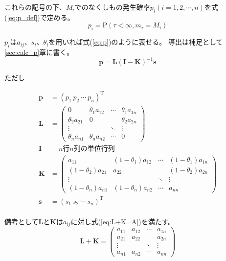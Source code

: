 \documentclass{jarticle}
\numberwithin{equation}{section}
\numberwithin{table}{section}
\begin{document}
これらの記号の下、$M_i$でのなくしもの発生確率$p_i(i=1,2,\cdots,n)$を式(\ref{eq:p_def})で定める。
\begin{equation}
    \label{eq:p_def}
    p_i =\mathrm{P}(\tau < \infty , m_\tau = M_i)
\end{equation}

$p_i$は$a_{i j}$、$s_i$、$\theta_i$を用いれば式(\ref{eq:p})のように表せる。
導出は補足として\ref{sec:calc_p}章に書く。
\begin{equation}
    \label{eq:p}
    \bm{p} =\bm{L}(\bm{I} - \bm{K})^{-1}\bm{s}
\end{equation}
\begin{center}
    ただし
\end{center}
\begin{align*}
    \bm{p} &= (p_1\ p_2\ \cdots\ p_n)^\mathrm{T} \\
    \bm{L} &= \begin{pmatrix}
        0                & \theta_1 a_{1 2} & \cdots & \theta_1 a_{1 n} \\
        \theta_2 a_{2 1} & 0                &        & \theta_2 a_{2 n} \\
        \vdots           &                  & \ddots & \vdots           \\
        \theta_n a_{n 1} & \theta_n a_{n 2} & \cdots & 0
    \end{pmatrix} \\
    \bm{I} & \quad \ \text{$n$行$n$列の単位行列} \\
    \bm{K} &= \begin{pmatrix}
                       a_{1 1} & (1 - \theta_1) a_{1 2} & \cdots & (1 - \theta_1) a_{1 n} \\
        (1 - \theta_2) a_{2 1} &                a_{2 2} &        & (1 - \theta_2) a_{2 n} \\
        \vdots                 &                        & \ddots & \vdots                 \\
        (1 - \theta_n) a_{n 1} & (1 - \theta_n) a_{n 2} & \cdots &                a_{n n}
    \end{pmatrix} \\
    \bm{s} &= (s_1\ s_2\ \cdots\ s_n)^\mathrm{T} \\
\end{align*}

備考として$\bm{L}$と$\bm{K}$は$a_{i j}$に対し式(\ref{eq:L+K=A})を満たす。
\begin{equation}
    \label{eq:L+K=A}
    \bm{L} + \bm{K} = \begin{pmatrix}
        a_{1 1} & a_{1 2} & \cdots & a_{1 n} \\
        a_{2 1} & a_{2 2} &        & a_{2 n} \\
        \vdots  &         & \ddots & \vdots  \\
        a_{n 1} & a_{n 2} & \cdots & a_{n n}
    \end{pmatrix}
\end{equation}
\end{document}
